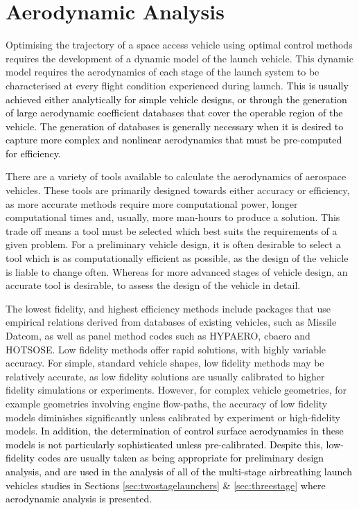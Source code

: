 







\section{Aerodynamic Analysis}

Optimising the trajectory of a space access vehicle using optimal control methods requires the development of a dynamic model of the launch vehicle. 
This dynamic model requires the aerodynamics of each stage of the launch system to be characterised at every flight condition experienced during launch. \textcolor{black}{This is usually achieved either analytically for simple vehicle designs, or through the generation of large aerodynamic coefficient databases that cover the operable region of the vehicle. The generation of databases is generally necessary when it is desired to capture more complex and nonlinear aerodynamics that must be pre-computed for efficiency.}

There are a variety of tools available to calculate the aerodynamics of aerospace vehicles.
 These tools are primarily designed towards either accuracy or efficiency, as more accurate methods require more computational power, longer computational times and, usually, more man-hours to produce a solution. 
This trade off means a tool must be selected which best suits the requirements of a given problem. 
For a preliminary vehicle design, it is often desirable to select a tool which is as computationally efficient as possible, as the design of the vehicle is liable to change often. 
Whereas for more advanced stages of vehicle design, an accurate tool is desirable, to assess the design of the vehicle in detail. 

The lowest fidelity, and highest efficiency methods include packages that use empirical relations derived from databases of existing vehicles, such as Missile Datcom\cite{Rosema2011}, as well as panel method codes such as HYPAERO\cite{Preller2017b}, cbaero\cite{Kinney2004} and HOTSOSE\cite{hotsose}. Low fidelity methods offer rapid solutions, with highly variable accuracy. For simple, standard vehicle shapes, low fidelity methods may be relatively accurate, as low fidelity solutions are usually calibrated to higher fidelity simulations or experiments. However, for complex vehicle geometries, for example geometries involving engine flow-paths, the accuracy of low fidelity models diminishes significantly\cite{Krause2011} unless calibrated by experiment or high-fidelity models. \textcolor{black}{In addition, the determination of control surface aerodynamics in these models is not particularly sophisticated unless pre-calibrated. Despite this, low-fidelity codes are usually taken as being appropriate for preliminary design analysis, and are used in the analysis of all of the multi-stage airbreathing launch vehicles studies in Sections \ref{sec:twostagelaunchers} \& \ref{sec:threestage} where aerodynamic analysis is presented\cite{Wilhite1991,Fujikawa2017,Mehta2001,Takahashi1997,Germain2001,Eklund2012,Bradford2002,Kimura1999,Preller2018a}.} 

